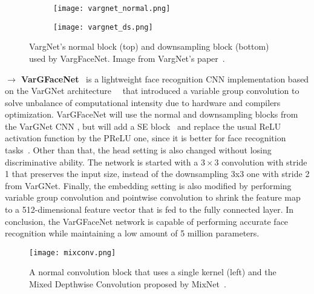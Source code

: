 \documentclass[class=report, crop=false, a4paper, 12pt]{standalone}
\begin{document}
\vspace{0.7\baselineskip}
\begin{figure}[H]
    \centering
    \begin{subfigure}{\textwidth}
        \centering
        \texttt{[image: vargnet\_normal.png]}
    \end{subfigure}
    
    \begin{subfigure}{\textwidth}
        \centering
        \texttt{[image: vargnet\_ds.png]}
    \end{subfigure}
    
    \caption[VargNet's normal and downsampling blocks used by VargFaceNet.]{VargNet's normal block (top) and downsampling block (bottom)~\autocite{zhangVarGNetVariableGroup2020} used by VargFaceNet. Image from VargNet's paper~\autocite{zhangVarGNetVariableGroup2020}.}
    \label{fig:vargnet}
\end{figure}

\noindent\textbf{$\rightarrow$ VarGFaceNet}~\autocite{yanVarGFaceNetEfficientVariable2019} is a lightweight face recognition CNN implementation based on the VarGNet architecture~\autocite{zhangVarGNetVariableGroup2020}~\autocite{chenMobileFaceNetsEfficientCNNs2018} that introduced a variable group convolution to solve unbalance of computational intensity due to hardware and compilers optimization. VarGFaceNet will use the normal and downsampling blocks from the VarGNet CNN , but will add a \gls{SE} block~\autocite{huSqueezeandExcitationNetworks2019} and replace the usual ReLU activation function by the \gls{PReLU} one, since it is better for face recognition tasks~\autocite{heDelvingDeepRectifiers2015}. Other than that, the head setting is also changed without losing discriminative ability. The network is started with a $3\times3$ convolution with stride 1 that preserves the input size, instead of the downsampling 3x3 one with stride 2 from VarGNet. Finally, the embedding setting is also modified by performing variable group convolution and pointwise convolution to shrink the feature map to a 512-dimensional feature vector that is fed to the fully connected layer. In conclusion, the VarGFaceNet network is capable of performing accurate face recognition while maintaining a low amount of 5 million parameters.

\vspace{0.7\baselineskip}
\begin{figure}[H]
    \centering
    \texttt{[image: mixconv.png]}
    \caption[A normal convolution block that uses a single kernel and the Mixed Depthwise Convolution proposed by MixNet.]{A normal convolution block that uses a single kernel (left) and the Mixed Depthwise Convolution proposed by MixNet~\autocite{tanMixConvMixedDepthwise}.}
    \label{fig:mixconv}
\end{figure}
\end{document}
